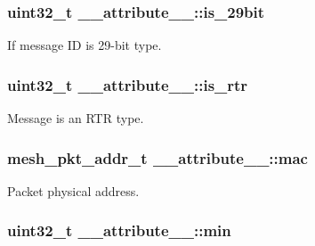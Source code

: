 \subsubsection[{\texorpdfstring{is\+\_\+29bit}{is_29bit}}]{\setlength{\rightskip}{0pt plus 5cm}uint32\+\_\+t \+\_\+\+\_\+attribute\+\_\+\+\_\+\+::is\+\_\+29bit}\hypertarget{struct____attribute_____a745166911ddda34c6f9e95e22d423207}{}\label{struct____attribute_____a745166911ddda34c6f9e95e22d423207}


If message ID is 29-\/bit type. 

\subsubsection[{\texorpdfstring{is\+\_\+rtr}{is_rtr}}]{\setlength{\rightskip}{0pt plus 5cm}uint32\+\_\+t \+\_\+\+\_\+attribute\+\_\+\+\_\+\+::is\+\_\+rtr}\hypertarget{struct____attribute_____afa1cea6cf94468a29ce2ad1b62a3de11}{}\label{struct____attribute_____afa1cea6cf94468a29ce2ad1b62a3de11}


Message is an R\+TR type. 

\subsubsection[{\texorpdfstring{mac}{mac}}]{\setlength{\rightskip}{0pt plus 5cm}mesh\+\_\+pkt\+\_\+addr\+\_\+t \+\_\+\+\_\+attribute\+\_\+\+\_\+\+::mac}\hypertarget{struct____attribute_____ab98af19336ed7ec3ca480cb93d16e106}{}\label{struct____attribute_____ab98af19336ed7ec3ca480cb93d16e106}


Packet physical address. 

\subsubsection[{\texorpdfstring{min}{min}}]{\setlength{\rightskip}{0pt plus 5cm}uint32\+\_\+t \+\_\+\+\_\+attribute\+\_\+\+\_\+\+::min}\hypertarget{struct____attribute_____a1620baad6e662539c31b4a82eb5d2bc1}{}\label{struct____attribute_____a1620baad6e662539c31b4a82eb5d2bc1}
